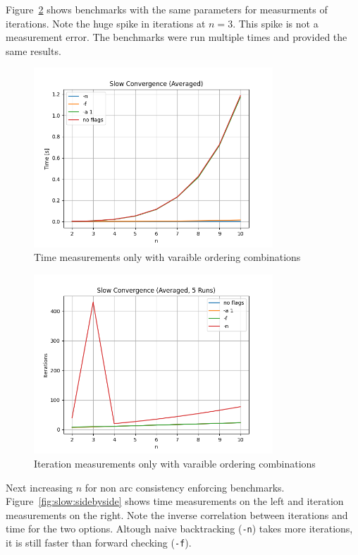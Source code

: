 Figure~\ref{fig:slow:iterations_small} shows benchmarks with the same parameters for measurments of iterations. Note the huge spike in iterations at $n = 3$. This spike is not a measurement error. The benchmarks were run multiple times and provided the same results.

\begin{figure}[ht]
	\centering
	\includegraphics[width=0.8\textwidth]{./Problems/slow_convergence/plots/time_small.png}
	\caption{Time measurements only with varaible ordering combinations}
	\label{fig:slow:time_small}
\end{figure}

\begin{figure}[ht]
	\centering
	\includegraphics[width=0.8\textwidth]{./Problems/slow_convergence/plots/iterations_small.png}
	\caption{Iteration measurements only with varaible ordering combinations}
	\label{fig:slow:iterations_small}
\end{figure}

Next increasing $n$ for non arc consistency enforcing benchmarks. Figure~\ref{fig:slow:sidebyside} shows time measurements on the left and iteration measurements on the right. Note the inverse correlation between iterations and time for the two options. Altough naive backtracking (\verb|-n|) takes more iterations, it is still faster than forward checking (\verb|-f|).

